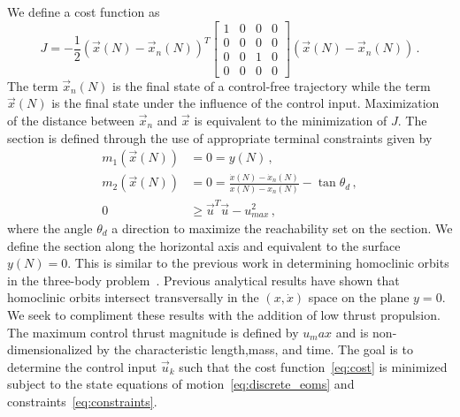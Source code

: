 \documentclass[preprint]{elsarticle}
\begin{document}
We define a  cost function as
\begin{equation}
	J = -\frac{1}{2} \left( \vec{x}(N) - \vec{x}_{n}(N)\right)^T 
	\left[
	\begin{array}{cccc}
		1 & 0& 0& 0 \\
		 0& 0& 0& 0\\
		 0 & 0 & 1 &0\\
		 0 & 0& 0& 0
	\end{array}
	\right]
	\left( \vec{x}(N) - \vec{x}_{n}(N)\right) \, .
	\label{eq:cost}
\end{equation}
The term \( \vec{x}_n(N) \) is the final state of a control-free trajectory while the term \( \vec{x}(N)\) is the final state under the influence of the control input.
Maximization of the distance between \( \vec{x}_n \) and \(\vec{x} \) is equivalent to the minimization of \( J \).
The \Poincare section is defined through the use of appropriate terminal constraints given by
\begin{subequations}
\begin{align}
    m_1( \vec{x}(N) ) &= 0 = y(N) \, , \\ 
    m_2 ( \vec{x}(N) )&= 0 = \frac{\dot{x}(N) - \dot{x}_n(N) }{x(N) -x_n(N) } - \tan{\theta_d} \, , \\
	 0 &\geq\vec{u}^T \vec{u} - u_{max}^2 \, ,
\end{align}
    \label{eq:constraints}
\end{subequations}
where the angle \( \theta_d\) a direction to maximize the reachability set on the \Poincare section.
We define the \Poincare section along the horizontal axis and equivalent to the  surface \( y(N) = 0 \).
This is similar to the previous work in determining homoclinic orbits in the three-body problem~\cite{llibre1985,koon2011}.
Previous analytical results have shown that homoclinic orbits intersect transversally in the \( (x, \dot{x} ) \) space on the plane \( y = 0 \).
We seek to compliment these results with the addition of low thrust propulsion.
The maximum control thrust magnitude is defined by \( u_max \) and is non-dimensionalized by the characteristic length,mass, and time.
The goal is to determine the control input \( \vec{u}_k\) such that the cost function~\cref{eq:cost} is minimized subject to the state equations of motion~\cref{eq:discrete_eoms} and constraints~\cref{eq:constraints}.
\end{document}
